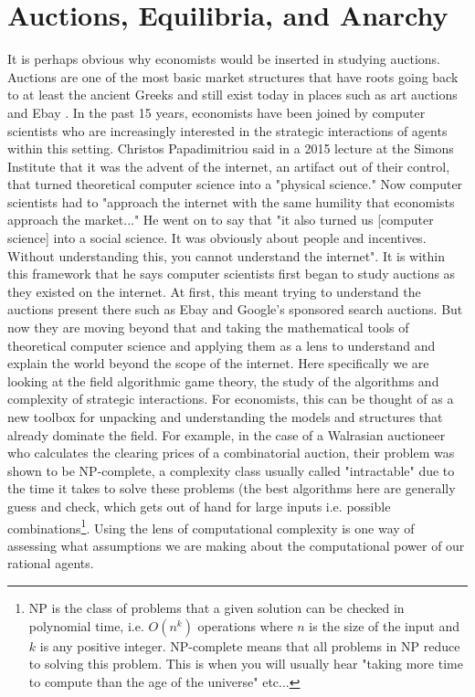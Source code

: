\documentclass[12pt,twoside]{reedthesis}
\begin{document}
\section{Auctions, Equilibria, and Anarchy}
It is perhaps obvious why economists would be inserted in studying auctions. Auctions are one of the most basic market structures that have roots going back to at least the ancient Greeks and still exist today in places such as art auctions and Ebay \citep{Mochon2015}. In the past 15 years, economists have been joined by computer scientists who are increasingly interested in the strategic interactions of agents within this setting. Christos Papadimitriou said in a 2015 lecture at the Simons Institute that it was the advent of the internet, an artifact out of their control, that turned theoretical computer science into a "physical science." Now computer scientists had to "approach the internet with the same humility that economists approach the market..." He went on to say that "it also turned us [computer science] into a social science. It was obviously about people and incentives. Without understanding this, you cannot understand the internet". It is within this framework that he says computer scientists first began to study auctions as they existed on the internet. At first, this meant trying to understand the auctions present there such as Ebay and Google's sponsored search auctions. But now they are moving beyond that and taking the mathematical tools of theoretical computer science and applying them as a lens to understand and explain the world beyond the scope of the internet. Here specifically we are looking at the field algorithmic game theory, the study of the algorithms and complexity of strategic interactions. For economists, this can be thought of as a new toolbox for unpacking and understanding the models and structures that already dominate the field. For example, in the case of a Walrasian auctioneer who calculates the clearing prices of a combinatorial auction, their problem was shown to be NP-complete, a complexity class usually called "intractable" due to the time it takes to solve these problems (the best algorithms here are generally guess and check, which gets out of hand for large inputs i.e. possible combinations\citep{Papadimitriou2015}\footnote{NP is the class of problems that a given solution can be checked in polynomial time, i.e. $O(n^k)$ operations where $n$ is the size of the input and $k$ is any positive integer. NP-complete means that all problems in NP reduce to solving this problem. This is when you will usually hear "taking more time to compute than the age of the universe" etc...}. Using the lens of computational complexity is one way of assessing what assumptions we are making about the computational power of our rational agents.
\end{document}
